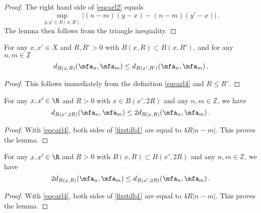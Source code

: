 \begin{proof}
\leanok
    The right hand side of \eqref{eqcarl2} equals
    $$
        \sup_{y,y'\in B(x,R)}|(n-m)(y-x)-(n-m)(y'-x)|\,.
    $$
    The lemma then follows from the triangle inequality.
\end{proof}

\begin{lemma}
\label{frequency-monotone}
\leanok
{}

    For any $x, x' \in X$ and $R, R' > 0$ with $B(x,R) \subset B(x, R')$, and for any $n, m \in \mathbb{Z}$
    $$
        d_{B(x,R)}(\mfa_n, \mfa_m) \le d_{B(x',R')}(\mfa_n, \mfa_m)\,.
    $$
\end{lemma}

\begin{proof}
\leanok
    This follows immediately from the definition \eqref{eqcarl4} and $R \le R'$.
\end{proof}

\begin{lemma}
\label{frequency-ball-doubling}
\leanok
{}
  For any $x,x'\in \R$ and $R>0$ with
   $x\in B(x',2R)$ and any $n,m\in \mathbb{Z}$, we have
\begin{equation}\label{firstdb1}
    d_{B(x',2R)}(\mfa_n,\mfa_m)\le 2 d_{B(x,R)}(\mfa_n,\mfa_m) \, .
\end{equation}
\end{lemma}

\begin{proof}
\leanok
With \eqref{eqcarl4}, both sides of \eqref{firstdb1} are equal to $4R|n-m|$. This proves the lemma.
\end{proof}

\begin{lemma}
\label{frequency-ball-growth}
\leanok
{}
    For any $x,x'\in \R$ and $R>0$ with
   $B(x,R)\subset B(x',2R)$ and any $n,m\in \mathbb{Z}$, we have
\begin{equation}\label{seconddb1}
    2d_{B(x,R)}(\mfa_n,\mfa_m)\le d_{B(x',2R)}(\mfa_n,\mfa_m) \, .
\end{equation}
\end{lemma}

\begin{proof}
\leanok
    With \eqref{eqcarl4}, both sides of \eqref{firstdb1} are equal to $4R|n-m|$. This proves the lemma.
\end{proof}

